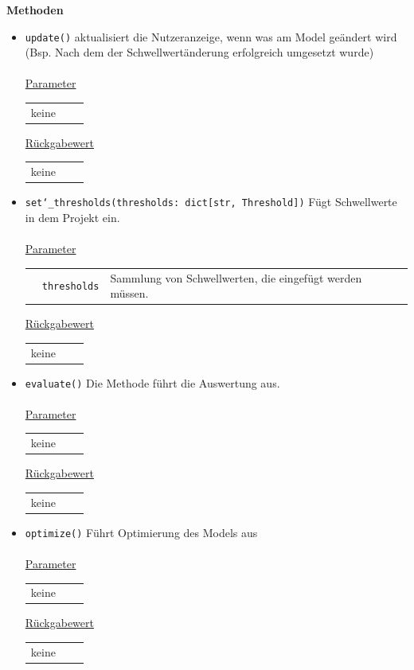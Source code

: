 \documentclass{article}
\begin{document}
\textbf{{Methoden}}
\begin{itemize}
\item \texttt{update()} \newline aktualisiert die Nutzeranzeige, wenn was am Model geändert wird (Bsp. Nach dem der Schwellwertänderung erfolgreich umgesetzt wurde)
\\\\
\underline{{Parameter}} 
\begin{tabular}{lll}
keine
\end{tabular}

\underline{{Rückgabewert}}
\begin{tabular}{lll}
keine
\end{tabular}

\item \texttt{set\char`_thresholds(thresholds: dict[str, Threshold])} \newline Fügt Schwellwerte in dem Projekt ein.
\\\\
\underline{{Parameter}} 
\begin{tabular}{lll}
 & \texttt{thresholds} & Sammlung von Schwellwerten, die eingefügt werden müssen. \\
\end{tabular}

\underline{{Rückgabewert}}
\begin{tabular}{lll}
keine
\end{tabular}

\item \texttt{evaluate()} \newline Die Methode führt die Auswertung aus.
\\\\
\underline{{Parameter}} 
\begin{tabular}{lll}
keine
\end{tabular}

\underline{{Rückgabewert}}
\begin{tabular}{lll}
keine
\end{tabular}

\item \texttt{optimize()} \newline Führt Optimierung des Models aus
\\\\
\underline{{Parameter}} 
\begin{tabular}{lll}
keine
\end{tabular}

\underline{{Rückgabewert}}
\begin{tabular}{lll}
keine
\end{tabular}


\end{itemize}
\end{document}
